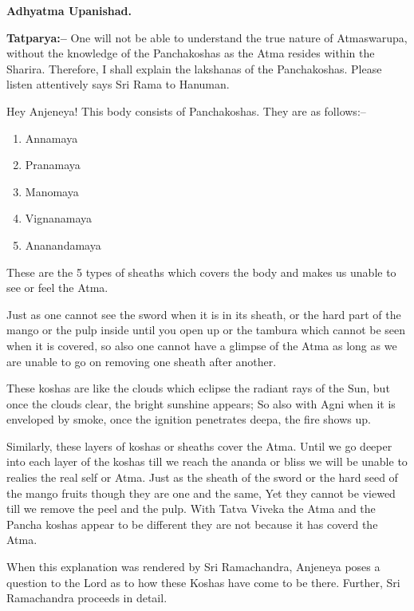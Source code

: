 \begin{flushright}
\textbf{Adhyatma Upanishad.}
\end{flushright}

\textbf{Tatparya:–} One will not be able to understand the true nature of Atmaswarupa, without the knowledge of the Panchakoshas as the Atma resides within the Sharira. Therefore, I shall explain the lakshanas of the Panchakoshas. Please listen attentively says Sri Rama to Hanuman.

Hey Anjeneya! This body consists of Panchakoshas. They are as follows:–

\begin{enumerate}
\item Annamaya

 \item Pranamaya

 \item Manomaya

 \item Vignanamaya

 \item Ananandamaya

\end{enumerate}

These are the 5 types of sheaths which covers the body and makes us unable to see or feel the Atma.

Just as one cannot see the sword when it is in its sheath, or the hard part of the mango or the pulp inside until you open up or the tambura which cannot be seen when it is covered, so also one cannot have a glimpse of the Atma as long as we are unable to go on removing one sheath after another.

These koshas are like the clouds which eclipse the radiant rays of the Sun, but once the clouds clear, the bright sunshine appears; So also with Agni when it is enveloped by smoke, once the ignition penetrates deepa, the fire shows up.

Similarly, these layers of koshas or sheaths cover the Atma. Until we go deeper into each layer of the koshas till we reach the ananda or bliss we will be unable to realies the real self or Atma. Just as the sheath of the sword or the hard seed of the mango fruits though they are one and the same, Yet they cannot be viewed till we remove the peel and the pulp. With Tatva Viveka the Atma and the Pancha koshas appear to be different they are not because it has coverd the Atma.

When this explanation was rendered by Sri Ramachandra, Anjeneya poses a question to the Lord as to how these Koshas have come to be there. Further, Sri Ramachandra proceeds in detail.

